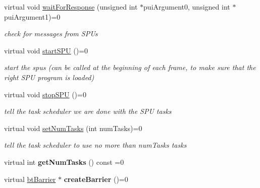 \begin{DoxyCompactItemize}
\mbox{\label{classbtThreadSupportInterface_abe3c8fa6998096a4804dbfd28882cfd9}} 
virtual void \hyperlink{classbtThreadSupportInterface_abe3c8fa6998096a4804dbfd28882cfd9}{wait\+For\+Response} (unsigned int $\ast$pui\+Argument0, unsigned int $\ast$pui\+Argument1)=0
\begin{DoxyCompactList}\small\item\em check for messages from S\+P\+Us \end{DoxyCompactList}\item 
virtual void \hyperlink{classbtThreadSupportInterface_a4d5139ae58302c0509c309ba9f3d2ca3}{start\+S\+PU} ()=0
\begin{DoxyCompactList}\small\item\em start the spus (can be called at the beginning of each frame, to make sure that the right S\+PU program is loaded) \end{DoxyCompactList}\item 
\mbox{\label{classbtThreadSupportInterface_a708419e843a0ebf0787983bcb50b8a83}} 
virtual void \hyperlink{classbtThreadSupportInterface_a708419e843a0ebf0787983bcb50b8a83}{stop\+S\+PU} ()=0
\begin{DoxyCompactList}\small\item\em tell the task scheduler we are done with the S\+PU tasks \end{DoxyCompactList}\item 
\mbox{\label{classbtThreadSupportInterface_a775436d1d71cc85639847d217aca78e6}} 
virtual void \hyperlink{classbtThreadSupportInterface_a775436d1d71cc85639847d217aca78e6}{set\+Num\+Tasks} (int num\+Tasks)=0
\begin{DoxyCompactList}\small\item\em tell the task scheduler to use no more than num\+Tasks tasks \end{DoxyCompactList}\item 
\mbox{\label{classbtThreadSupportInterface_acff24c922ddfd3d8b3a4353a8c03755d}} 
virtual int {\bfseries get\+Num\+Tasks} () const =0
\item 
\mbox{\label{classbtThreadSupportInterface_a227d5e777627f37d99a4301dfc88c618}} 
virtual \hyperlink{classbtBarrier}{bt\+Barrier} $\ast$ {\bfseries create\+Barrier} ()=0

\end{DoxyCompactItemize}
